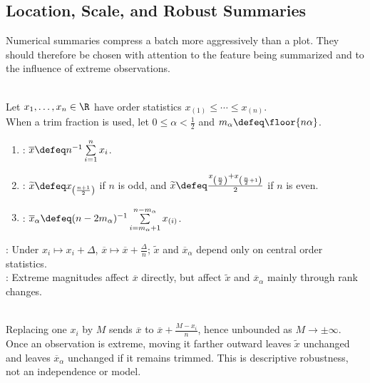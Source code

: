 \subsection{Location, Scale, and Robust Summaries}

Numerical summaries compress a batch more aggressively than a plot.  They should therefore be chosen with attention to the feature being summarized and to the influence of extreme observations.

\begin{definition} \label{def:location-summaries-for-data} \\
Let $x_1,\ldots,x_n\in\R$ have order statistics $x_{(1)}\leq\cdots\leq x_{(n)}$.\\
When a trim fraction is used, let $0\leq\alpha<\frac{1}{2}$ and $m_\alpha\defeq\floor{n\alpha}$.
\begin{enumerate}[label=(\roman*)]
\setlength{\itemsep}{0pt}
\item {}: $\overline{x}\defeq n^{-1}\sum\limits_{i=1}^n x_i$.
\item {}: $\widetilde{x}\defeq x_{\left(\frac{n+1}{2}\right)}$ if $n$ is odd, and $\widetilde{x}\defeq\frac{x_{\left(\frac{n}{2}\right)}+x_{\left(\frac{n}{2}+1\right)}}{2}$ if $n$ is even.
\item {}: $\overline{x}_\alpha\defeq(n-2m_\alpha)^{-1}\sum\limits_{i=m_\alpha+1}^{n-m_\alpha}x_{(i)}$.
\end{enumerate}
: Under $x_i\mapsto x_i+\Delta$, $\overline{x}\mapsto\overline{x}+\frac{\Delta}{n}$; $\widetilde{x}$ and $\overline{x}_\alpha$ depend only on central order statistics.\\
: Extreme magnitudes affect $\overline{x}$ directly, but affect $\widetilde{x}$ and $\overline{x}_\alpha$ mainly through rank changes.
\end{definition}

\begin{remark} \label{rem:outliers-and-location-summaries} \\
Replacing one $x_i$ by $M$ sends $\overline{x}$ to $\overline{x}+\frac{M-x_i}{n}$, hence unbounded as $M\to\pm\infty$.\\
Once an observation is extreme, moving it farther outward leaves $\widetilde{x}$ unchanged and leaves $\overline{x}_\alpha$ unchanged if it remains trimmed. This is descriptive robustness, not an independence or model.
\end{remark}

